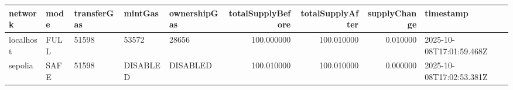 \begin{tabular}{lllllrrrl}
\toprule
network & mode & transferGas & mintGas & ownershipGas & totalSupplyBefore & totalSupplyAfter & supplyChange & timestamp \\
\midrule
localhost & FULL & 51598 & 53572 & 28656 & 100.000000 & 100.010000 & 0.010000 & 2025-10-08T17:01:59.468Z \\
sepolia & SAFE & 51598 & DISABLED & DISABLED & 100.010000 & 100.010000 & 0.000000 & 2025-10-08T17:02:53.381Z \\
\bottomrule
\end{tabular}

